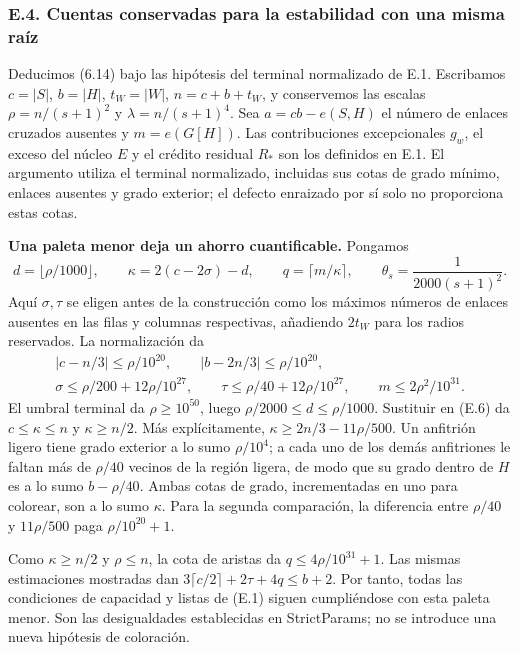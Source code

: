 \documentclass[spanish,11pt,a4paper]{article}
\begin{document}
\subsubsection{E.4. Cuentas conservadas para la estabilidad con una misma raíz}\label{e.4.-cuentas-conservadas-para-la-estabilidad-con-una-misma-raiz}

Deducimos (6.14) bajo las hipótesis del terminal normalizado de E.1. Escribamos \(c=|S|\), \(b=|H|\), \(t_W=|W|\), \(n=c+b+t_W\), y conservemos las escalas \(\rho=n/(s+1)^2\) y \(\lambda=n/(s+1)^4\). Sea \(a=cb-e(S,H)\) el número de enlaces cruzados ausentes y \(m=e(G[H])\). Las contribuciones excepcionales \(g_w\), el exceso del núcleo \(E\) y el crédito residual \(R_*\) son los definidos en E.1. El argumento utiliza el terminal normalizado, incluidas sus cotas de grado mínimo, enlaces ausentes y grado exterior; el defecto enraizado por sí solo no proporciona estas cotas.

\textbf{Una paleta menor deja un ahorro cuantificable.} Pongamos \[
d=\lfloor\rho/1000\rfloor,\qquad
\kappa=2(c-2\sigma)-d,\qquad
q=\lceil m/\kappa\rceil,\qquad
\theta_s=\frac1{2000(s+1)^2}.
\tag{E.6}
\] Aquí \(\sigma,\tau\) se eligen antes de la construcción como los máximos números de enlaces ausentes en las filas y columnas respectivas, añadiendo \(2t_W\) para los radios reservados. La normalización da \[
\begin{gathered}
|c-n/3|\le\rho/10^{20},\qquad
|b-2n/3|\le\rho/10^{20},\\
\sigma\le\rho/200+12\rho/10^{27},\qquad
\tau\le\rho/40+12\rho/10^{27},\qquad
m\le2\rho^2/10^{31}.
\end{gathered}
\] El umbral terminal da \(\rho\ge10^{50}\), luego \(\rho/2000\le d\le\rho/1000\). Sustituir en (E.6) da \(c\le\kappa\le n\) y \(\kappa\ge n/2\). Más explícitamente, \(\kappa\ge2n/3-11\rho/500\). Un anfitrión ligero tiene grado exterior a lo sumo \(\rho/10^4\); a cada uno de los demás anfitriones le faltan más de \(\rho/40\) vecinos de la región ligera, de modo que su grado dentro de \(H\) es a lo sumo \(b-\rho/40\). Ambas cotas de grado, incrementadas en uno para colorear, son a lo sumo \(\kappa\). Para la segunda comparación, la diferencia entre \(\rho/40\) y \(11\rho/500\) paga \(\rho/10^{20}+1\).

Como \(\kappa\ge n/2\) y \(\rho\le n\), la cota de aristas da \(q\le4\rho/10^{31}+1\). Las mismas estimaciones mostradas dan \(3\lceil c/2\rceil+2\tau+4q\le b+2\). Por tanto, todas las condiciones de capacidad y listas de (E.1) siguen cumpliéndose con esta paleta menor. Son las desigualdades establecidas en {\ttfamily\small StrictParams}; no se introduce una nueva hipótesis de coloración.
\end{document}
